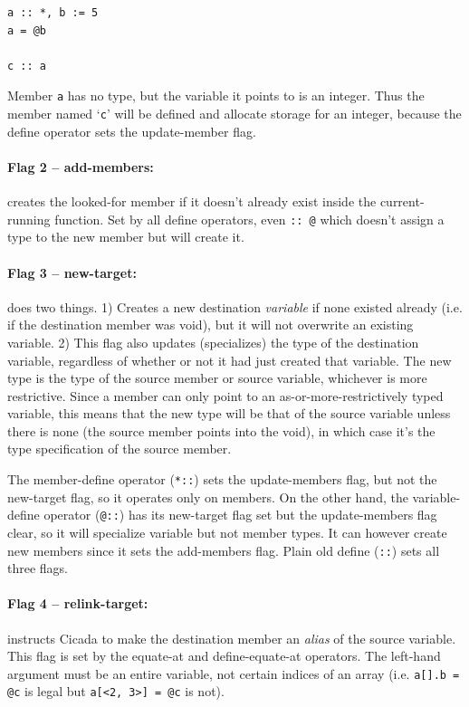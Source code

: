 \documentclass{article}
\newenvironment{code}{
       \begin{list}{}{
               \setlength{\leftmargin}{.4in}
               \setlength{\rightmargin}{0in}
               \setlength{\topsep}{.2in}
       }
       \small
       \item[] }
       { \end{list}   }
\begin{document}
\begin{code} \begin{verbatim}
a :: *, b := 5
a = @b

c :: a
\end{verbatim} \end{code}

\noindent Member \verb#a# has no type, but the variable it points to is an integer.  Thus the member named `\verb#c#' will be defined and allocate storage for an integer, because the define operator sets the update-member flag.\\


\paragraph{Flag 2 -- add-members:}  creates the looked-for member if it doesn't already exist inside the current-running function.  Set by all define operators, even \verb#:: @# which doesn't assign a type to the new member but will create it.\\


\paragraph{Flag 3 -- new-target:}  does two things.  1) Creates a new destination \emph{variable} if none existed already (i.e. if the destination member was void), but it will not overwrite an existing variable.  2) This flag also updates (specializes) the type of the destination variable, regardless of whether or not it had just created that variable.  The new type is the type of the source member or source variable, whichever is more restrictive.  Since a member can only point to an as-or-more-restrictively typed variable, this means that the new type will be that of the source variable unless there is none (the source member points into the void), in which case it's the type specification of the source member.

The member-define operator (\verb#*::#) sets the update-members flag, but not the new-target flag, so it operates only on members.  On the other hand, the variable-define operator (\verb#@::#) has its new-target flag set but the update-members flag clear, so it will specialize variable but not member types.  It can however create new members since it sets the add-members flag.  Plain old define (\verb#::#) sets all three flags.\\


\paragraph{Flag 4 -- relink-target:}  instructs Cicada to make the destination member an \emph{alias} of the source variable.  This flag is set by the equate-at and define-equate-at operators.  The left-hand argument must be an entire variable, not certain indices of an array (i.e. \verb#a[].b = @c# is legal but \verb#a[<2, 3>] = @c# is not).
\end{document}
